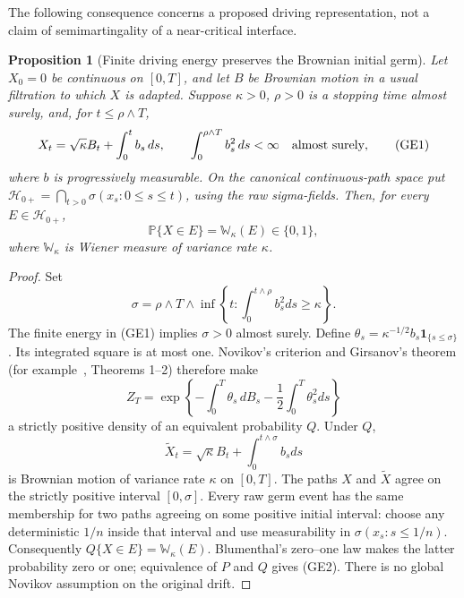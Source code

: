 \documentclass[11pt]{article}
\newtheorem{proposition}[theorem]{Proposition}
\theoremstyle{definition}\newtheorem{definition}[theorem]{Definition}
\theoremstyle{remark}\newtheorem{remark}[theorem]{Remark}
\begin{document}
The following consequence concerns a proposed driving representation,
not a claim of semimartingality of a near-critical interface.

\begin{proposition}[Finite driving energy preserves the Brownian initial germ]
\label{prop:finite-energy-germ}
Let $X_0=0$ be continuous on $[0,T]$, and let $B$ be Brownian motion
in a usual filtration to which $X$ is adapted. Suppose $\kappa>0$, $\rho>0$
is a stopping time almost surely, and, for $t\le\rho\wedge T$,
\[
 X_t=\sqrt\kappa B_t+\int_0^t b_s\,ds,\qquad
 \int_0^{\rho\wedge T}b_s^2\,ds<\infty\quad\hbox{almost surely},
 \tag{GE1}
\]
where $b$ is progressively measurable. On the canonical continuous-path
space put $\mathcal H_{0+}=\bigcap_{t>0}\sigma(x_s:0\le s\le t)$,
using the raw sigma-fields. Then, for every $E\in\mathcal H_{0+}$,
\[
 \mathbb P\{X\in E\}=\mathbb W_\kappa(E)\in\{0,1\},
 \tag{GE2}
\]
where $\mathbb W_\kappa$ is Wiener measure of variance rate $\kappa$.
\end{proposition}
\begin{proof}
Set
\[
 \sigma=\rho\wedge T\wedge
       \inf\left\{t:\int_0^{t\wedge\rho}b_s^2ds\ge\kappa\right\}.
\]
The finite energy in (GE1) implies $\sigma>0$ almost surely. Define
$\theta_s=\kappa^{-1/2}b_s\mathbf1_{\{s\le\sigma\}}$. Its integrated
square is at most one. Novikov's criterion and Girsanov's theorem
(for example~\cite{lalley-girsanov}, Theorems 1--2) therefore make
\[
 Z_T=\exp\left\{-\int_0^T\theta_s\,dB_s
                         -\frac12\int_0^T\theta_s^2ds\right\}
\]
a strictly positive density of an equivalent probability $Q$. Under $Q$,
\[
 \widetilde X_t=\sqrt\kappa B_t+\int_0^{t\wedge\sigma}b_sds
\]
is Brownian motion of variance rate $\kappa$ on $[0,T]$. The paths
$X$ and $\widetilde X$ agree on the strictly positive interval
$[0,\sigma]$. Every raw germ event has the same membership for two
paths agreeing on some positive initial interval: choose any deterministic
$1/n$ inside that interval and use measurability in
$\sigma(x_s:s\le1/n)$. Consequently
$Q\{X\in E\}=\mathbb W_\kappa(E)$. Blumenthal's zero--one law makes
the latter probability zero or one; equivalence of $P$ and $Q$ gives
(GE2). There is no global Novikov assumption on the original drift.
\end{proof}
\end{document}
